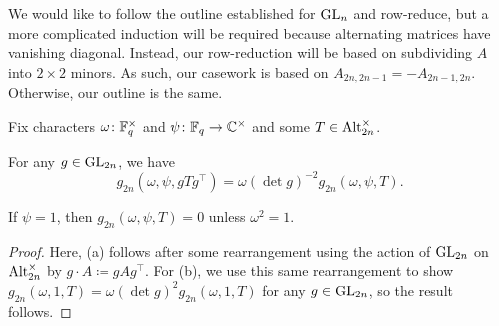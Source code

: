 We would like to follow the outline established for $\mathrm{GL}_n$ and row-reduce, but a more complicated induction will be required because alternating matrices have vanishing diagonal. Instead, our row-reduction will be based on subdividing $A$ into $2\times2$ minors. As such, our casework is based on $A_{2n,2n-1}=-A_{2n-1,2n}$. Otherwise, our outline is the same.
\begin{lemma} \label{lem:gsum-alt-basic}
    Fix characters $\omega\colon\mathbb F_q^\times$ and $\psi\colon\mathbb F_q\to\mathbb C^\times$ and some $T\in\operatorname{Alt}_{2n}^\times$.
    \begin{listalph}
        \item For any $g\in\mathrm{GL}_{2n}$, we have
        \[g_{2n}(\omega,\psi,gTg^\intercal)=\omega(\det g)^{-2}g_{2n}(\omega,\psi,T).\]
        \item If $\psi=1$, then $g_{2n}(\omega,\psi,T)=0$ unless $\omega^2=1$.
    \end{listalph}
\end{lemma}
\begin{proof}
    Here, (a) follows after some rearrangement using the action of $\mathrm{GL}_{2n}$ on $\operatorname{Alt}_{2n}^\times$ by $g\cdot A\coloneqq gAg^\intercal$. For (b), we use this same rearrangement to show $g_{2n}(\omega,1,T)=\omega(\det g)^2g_{2n}(\omega,1,T)$ for any $g\in\mathrm{GL}_{2n}$, so the result follows.
\end{proof}
